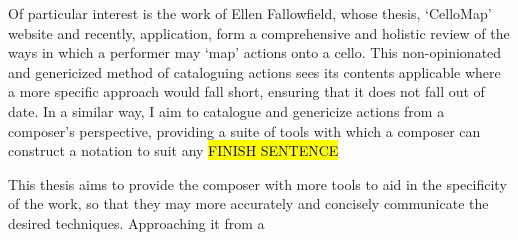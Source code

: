 Of particular interest is the work of Ellen Fallowfield, whose thesis, `CelloMap' website and recently, application, form a comprehensive and holistic review of the ways in which a performer may `map' actions onto a cello.\autocite[]{fallowfieldCelloMapHandbook2009,fallowfieldCelloMap}
This non-opinionated and genericized method of cataloguing actions sees its contents applicable where a more specific approach would fall short, ensuring that it does not fall out of date.
In a similar way, I aim to catalogue and genericize actions from a composer's perspective, providing a suite of tools with which a composer can construct a notation to suit any \hl{FINISH SENTENCE}


This thesis aims to provide the composer with more tools to aid in the specificity of the work, so that they may more accurately and concisely communicate the desired techniques.
Approaching it from a 
